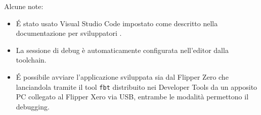 Alcune note:
\begin{itemize}
  \item É stato usato Visual Studio Code impostato come descritto nella documentazione per sviluppatori \cite{devtools}.
  \item La sessione di debug è automaticamente configurata nell'editor dalla toolchain.
  \item É possibile avviare l'applicazione sviluppata sia dal Flipper Zero che lanciandola tramite il tool \texttt{fbt} distribuito nei Developer Tools da un apposito PC collegato al Flipper Xero via USB, entrambe le modalità permettono il debugging.
\end{itemize}
